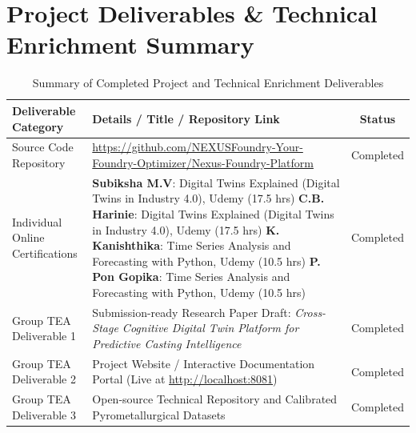 \documentclass[11pt, a4paper]{article}
\begin{document}
\section{Project Deliverables \& Technical Enrichment Summary}
\begin{table}[H]
    \centering
    \footnotesize
    \renewcommand{\arraystretch}{1.2}
    \begin{tabular}{|p{4.2cm}|p{7.5cm}|c|}
        \hline
        \textbf{Deliverable Category} & \textbf{Details / Title / Repository Link} & \textbf{Status} \\
        \hline
        Source Code Repository & \url{https://github.com/NEXUSFoundry-Your-Foundry-Optimizer/Nexus-Foundry-Platform} & Completed \\
        \hline
        Individual Online Certifications & 
        \textbf{Subiksha M.V}: Digital Twins Explained (Digital Twins in Industry 4.0), Udemy (17.5 hrs) \newline
        \textbf{C.B. Harinie}: Digital Twins Explained (Digital Twins in Industry 4.0), Udemy (17.5 hrs) \newline
        \textbf{K. Kanishthika}: Time Series Analysis and Forecasting with Python, Udemy (10.5 hrs) \newline
        \textbf{P. Pon Gopika}: Time Series Analysis and Forecasting with Python, Udemy (10.5 hrs) & Completed \\
        \hline
        Group TEA Deliverable 1 & Submission-ready Research Paper Draft: \textit{Cross-Stage Cognitive Digital Twin Platform for Predictive Casting Intelligence} & Completed \\
        \hline
        Group TEA Deliverable 2 & Project Website / Interactive Documentation Portal (Live at \url{http://localhost:8081}) & Completed \\
        \hline
        Group TEA Deliverable 3 & Open-source Technical Repository and Calibrated Pyrometallurgical Datasets & Completed \\
        \hline
    \end{tabular}
    \caption{Summary of Completed Project and Technical Enrichment Deliverables}
\end{table}

\vspace{0.2cm}
\nocite{*}
\renewcommand{\refname}{\large\bfseries\color{amritaMaroon}References}


\end{document}

